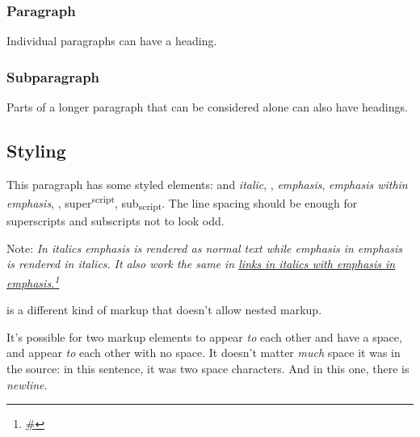 \subsubsection{Paragraph\label{paragraph}}%
\begin{flushleft}\end{flushleft}%
Individual paragraphs can have a heading.

\subsubsection{Subparagraph\label{subparagraph}}%
\begin{flushleft}\end{flushleft}%
Parts of a longer paragraph that can be considered alone can also have headings.

\subsection{Styling\label{styling}}%
\begin{flushleft}\end{flushleft}%
This paragraph has some styled elements:  and \emph{italic}, , \emph{emphasis}, \emph{\emph{emphasis} within emphasis}, , super\textsuperscript{script}, sub\textsubscript{script}. The line spacing should be enough for superscripts and subscripts not to look odd.

\begin{flushleft}\end{flushleft}%
Note: \emph{In italics \emph{emphasis} is rendered as normal text while \emph{emphasis \emph{in} emphasis} is rendered in italics.} \emph{It also work the same in \href{\#}{links in italics with \emph{emphasis \emph{in} emphasis}.}\footnote{\url{\#}}}

\begin{flushleft}\end{flushleft}%
 is a different kind of markup that doesn't allow nested markup.

\begin{flushleft}\end{flushleft}%
It's possible for two markup elements to appear  \emph{to} each other and have a space, and appear \emph{to} each other with no space. It doesn't matter  \emph{much} space it was in the source: in this sentence, it was two space characters. And in this one, there is  \emph{newline}.

